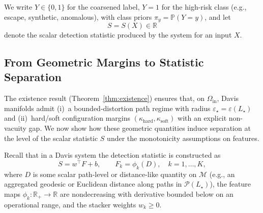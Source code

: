 \documentclass[11pt]{article}
\newcommand{\Prob}{\mathbb{P}}
\begin{document}
We write $Y \in \{0,1\}$ for the coarsened label, $Y=1$ for the high-risk class (e.g., escape,
synthetic, anomalous), with class priors $\pi_y = \Prob(Y=y)$, and let
\[
S = S(X) \in \mathbb{R}
\]
denote the scalar detection statistic produced by the system for an input $X$.

\subsection{From Geometric Margins to Statistic Separation}

The existence result (Theorem~\ref{thm:existence}) ensures that, on $\Omega_{\mathrm{in}}$, Davis
manifolds admit (i)~a bounded-distortion path regime with radius $\varepsilon_\star = \varepsilon(L_\star)$
and (ii)~hard/soft configuration margins $(\kappa_{\mathrm{hard}}, \kappa_{\mathrm{soft}})$ with an
explicit non-vacuity gap. We now show how these geometric quantities induce separation at the
level of the scalar statistic $S$ under the monotonicity assumptions on features.

Recall that in a Davis system the detection statistic is constructed as
\[
S = w^\top F + b,\qquad F_k = \phi_k(D),\quad k=1,\dots,K,
\]
where $D$ is some scalar path-level or distance-like quantity on $\mathcal{M}$ (e.g., an aggregated
geodesic or Euclidean distance along paths in $\mathcal{P}(L_\star)$), the feature maps
$\phi_k : \mathbb{R}_+ \to \mathbb{R}$ are nondecreasing with derivative bounded below on an
operational range, and the stacker weights $w_k \ge 0$.
\end{document}
